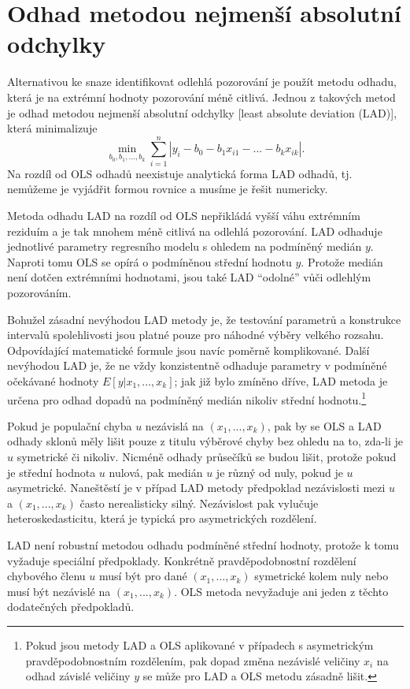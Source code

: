 \section{Odhad metodou nejmenší absolutní odchylky}

Alternativou ke snaze identifikovat odlehlá pozorování je použít metodu odhadu, která je na extrémní hodnoty pozorování méně citlivá. Jednou z takových metod je odhad metodou nejmenší absolutní odchylky [least absolute deviation (LAD)], která minimalizuje
\begin{equation}
\min\limits_{b_0, b_1, ..., b_k} \sum_{i = 1}^n |y_i - b_0 - b_1 x_{i1} - ... - b_k x_{ik}|.
\end{equation}
Na rozdíl od OLS odhadů neexistuje analytická forma LAD odhadů, tj. nemůžeme je vyjádřit formou rovnice a musíme je řešit numericky.

Metoda odhadu LAD na rozdíl od OLS nepřikládá vyšší váhu extrémním reziduím a je tak mnohem méně citlivá na odlehlá pozorování. LAD odhaduje jednotlivé parametry regresního modelu s ohledem na podmíněný medián $y$. Naproti tomu OLS se opírá o podmíněnou střední hodnotu $y$. Protože medián není dotčen extrémními hodnotami, jsou také LAD ``odolné'' vůči odlehlým pozorováním.

Bohužel zásadní nevýhodou LAD metody je, že testování parametrů a konstrukce intervalů spolehlivosti jsou platné pouze pro náhodné výběry velkého rozsahu. Odpovídající matematické formule jsou navíc poměrně komplikované. Další nevýhodou LAD je, že ne vždy konzistentně odhaduje parametry v podmíněné očekávané hodnoty $E[y|x_1, ..., x_k]$; jak již bylo zmíněno dříve, LAD metoda je určena pro odhad dopadů na podmíněný medián nikoliv střední hodnotu.\footnote{Pokud jsou metody LAD a OLS aplikované v případech s asymetrickým pravděpodobnostním rozdělením, pak dopad změna nezávislé veličiny $x_i$ na odhad závislé veličiny $y$ se může pro LAD a OLS metodu zásadně lišit.}

Pokud je populační chyba $u$ nezávislá na $(x_1, ..., x_k)$, pak by se OLS a LAD odhady sklonů měly lišit pouze z titulu výběrové chyby bez ohledu na to, zda-li je $u$ symetrické či nikoliv. Nicméně odhady průsečíků se budou lišit, protože pokud je střední hodnota $u$ nulová, pak medián $u$ je různý od nuly, pokud je $u$ asymetrické. Naneštěstí je v případ LAD metody předpoklad nezávislosti mezi $u$ a $(x_1, ..., x_k)$ často nerealisticky silný. Nezávislost pak vylučuje heteroskedasticitu, která je typická pro asymetrických rozdělení.

LAD není robustní metodou odhadu podmíněné střední hodnoty, protože k tomu vyžaduje speciální předpoklady. Konkrétně pravděpodobnostní rozdělení chybového členu $u$ musí být pro dané $(x_1, ..., x_k)$ symetrické kolem nuly nebo musí být nezávislé na $(x_1, ..., x_k)$. OLS metoda nevyžaduje ani jeden z těchto dodatečných předpokladů.
